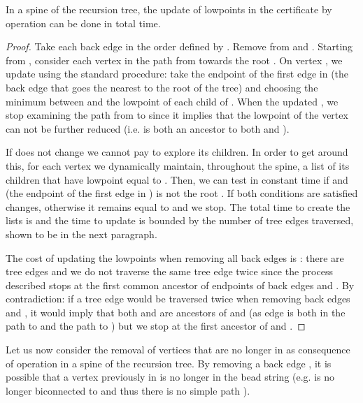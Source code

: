 \begin{lemma}
	In a spine of the recursion tree, the update of lowpoints in
	the certificate by operation  can be done
	in  total time.  \label{lem:lowpoints}
\end{lemma}
\begin{proof}
	Take each back edge  in the order defined by
        . Remove  from  and .
        Starting from , consider each vertex  in the path from
         towards the root .  On vertex , we update
         using the standard procedure: take the
        endpoint  of the first edge in  (the back edge that
        goes the nearest to the root of the tree) and choosing the
        minimum between  and the lowpoint of each child of
        .  When the updated , we
        stop examining the path from  to  since it implies
        that the lowpoint of the vertex can not be further reduced
        (i.e.  is both an ancestor to both  and
        ).

	If  does not change we cannot pay to
	explore its children. In order to get around this, for each
	vertex we dynamically maintain, throughout the spine, a list
	 of its children that have lowpoint equal to
	. Then, we can test in constant time if  and  (the endpoint of the first edge in )
	is not the root . If both conditions are satisfied
	 changes, otherwise it remains equal to
	 and we stop. The total time to create the lists is
	 and the time to update is bounded by the number of
	tree edges traversed, shown to be  in the next
	paragraph.

	The cost of updating the lowpoints when removing all
	back edges  is : there are  tree
	edges and we do not traverse the same tree edge twice since
	the process described stops at the first common ancestor of
	endpoints of back edges  and . By contradiction:
	if a tree edge  would be traversed twice when removing
	back edges  and , it would imply that both 
	and  are ancestors of  and  (as edge 
	is both in the path  to  and the path  to
	) but we stop at the first ancestor of  and
	.
\end{proof}

Let us now consider the removal of vertices that
are no longer in  as consequence of operation
 in a spine of the recursion tree. By removing a
back edge , it is possible that a vertex  previously
in  is no longer in the bead string  (e.g.  is no
longer biconnected to  and thus there is no simple path ). 


